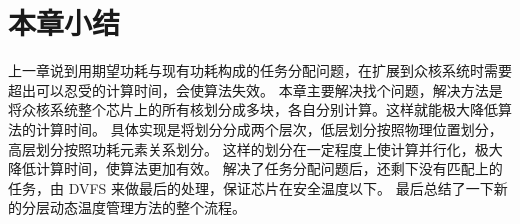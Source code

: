 \section{本章小结}\label{sec:xiaojie5}
上一章说到用期望功耗与现有功耗构成的任务分配问题，在扩展到众核系统时需要超出可以忍受的计算时间，会使算法失效。
本章主要解决找个问题，解决方法是将众核系统整个芯片上的所有核划分成多块，各自分别计算。这样就能极大降低算法的计算时间。
具体实现是将划分分成两个层次，低层划分按照物理位置划分，高层划分按照功耗元素关系划分。
这样的划分在一定程度上使计算并行化，极大降低计算时间，使算法更加有效。
解决了任务分配问题后，还剩下没有匹配上的任务，由 DVFS 来做最后的处理，保证芯片在安全温度以下。
最后总结了一下新的分层动态温度管理方法的整个流程。














































